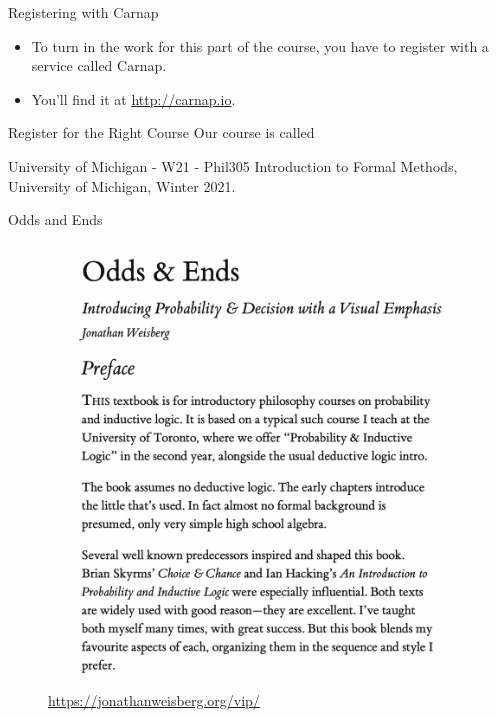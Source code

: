 \documentclass[
  ignorenonframetext,
]{beamer}
\providecommand{\tightlist}{%
  \setlength{\itemsep}{0pt}\setlength{\parskip}{0pt}}
\renewcommand{\,}{\text{, }}
\renewenvironment*{quote}	
	{\list{}{\rightmargin   \leftmargin} \item } 	
	{\endlist }
\begin{document}
\begin{frame}{Registering with Carnap}
\protect\hypertarget{registering-with-carnap}{}
\begin{itemize}
\tightlist
\item
  To turn in the work for this part of the course, you have to register
  with a service called Carnap.
\item
  You'll find it at \url{http://carnap.io}.
\end{itemize}
\end{frame}

\begin{frame}{Register for the Right Course}
\protect\hypertarget{register-for-the-right-course}{}
Our course is called

\begin{quote}
University of Michigan - W21 - Phil305 Introduction to Formal Methods,
University of Michigan, Winter 2021.
\end{quote}
\end{frame}

\begin{frame}{Odds and Ends}
\protect\hypertarget{odds-and-ends}{}
\begin{figure}
\centering
\includegraphics[width=\textwidth,height=0.8\textheight]{../images/1_1_Odds_and_Ends.png}
\caption{\url{https://jonathanweisberg.org/vip/}}
\end{figure}
\end{frame}
\end{document}
